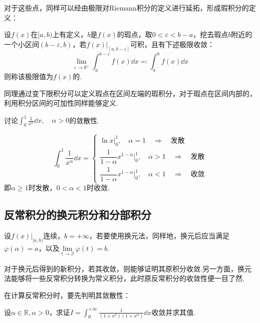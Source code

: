 对于这些点，同样可以经由极限对Riemann积分的定义进行延拓，形成瑕积分的定义：
\begin{definition}
    设$f(x)$在$[a,b)$上有定义，$b$是$f(x)$的瑕点，取$0<\varepsilon<b-a$，挖去瑕点$b$附近的一个小区间$(b-\varepsilon,b)$，若$\left.f(x)\right|_{[a,b-\varepsilon]}$可积，且有下述极限收敛：
    \[\lim_{\varepsilon\to 0^+}\int_{a}^{b-\varepsilon}f(x)\dd{x} \eqcolon \int_{a}^{b}f(x)\dd{x}\]
    则称该极限值为$f(x)$的.
\end{definition}

同理通过变下限积分可以定义瑕点在区间左端的瑕积分，对于瑕点在区间内部的，利用积分区间的可加性同样能够定义.

\begin{question}
    讨论$\displaystyle\int_{0}^{1}\frac{1}{x^\alpha}\dd{x},\quad\alpha>0$的敛散性.
\end{question}

\begin{solution}
    \[\int_{0}^{1}\frac{1}{x^\alpha}\dd{x} = \begin{cases}
        \ln x\Big|_0^1, \quad \alpha=1 \quad\Rightarrow\quad \text{发散}\\[1em]
        \dfrac{1}{1-\alpha}x^{1-\alpha}\Big|_0^1, \quad \alpha>1 \quad\Rightarrow\quad \text{发散}\\[1em]
        \dfrac{1}{1-\alpha}x^{1-\alpha}\Big|_0^1, \quad \alpha<1 \quad\Rightarrow\quad \text{收敛}
    \end{cases}\]
    即$\alpha\geqslant 1$时发散，$0<\alpha<1$时收敛.
\end{solution}


\subsection{反常积分的换元积分和分部积分}
设$\left.f(x)\right|_{[a,b)}$连续，$b=+\infty$，若要使用换元法，同样地，换元后应当满足$\varphi(\alpha)=a$，以及$\lim\limits_{t \to \beta}\varphi(t)=b$.

对于换元后得到的新积分，若其收敛，则能够证明其原积分收敛.另一方面，换元法能够将一些反常积分转换为常义积分，此时原反常积分的收敛性便一目了然.

在计算反常积分时，要先判明其敛散性：
\begin{question}
    设$\alpha\in\mathbb{R},\alpha>0$，求证$\displaystyle I = \int_{0}^{+\infty}\frac{1}{(1+x^2)(1+x^\alpha)}\dd{x}$收敛并求其值.
\end{question}

